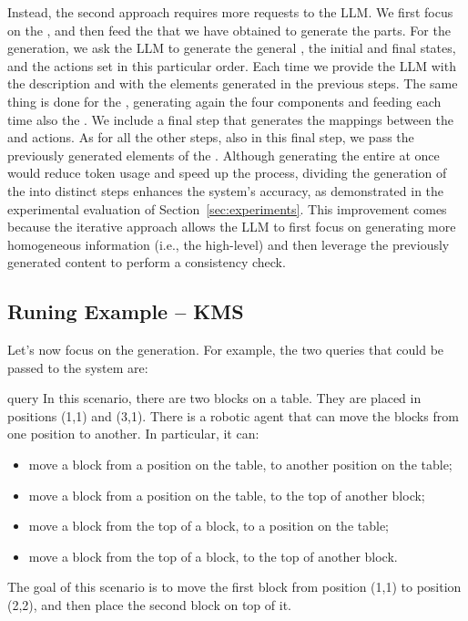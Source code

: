 Instead, the second approach requires more requests to the LLM. We first focus on the \HL \kb, and then feed the \kb that we have obtained to generate the \LL parts. For the \HL generation, we ask the LLM to generate the general \kb, the initial and final states, and the actions set in this particular order. Each time we provide the LLM with the \HL description and with the elements generated in the previous steps. The same thing is done for the \LL \kb, generating again the four components and feeding each time also the \HL \kb. We include a final step that generates the mappings between the \HL and \LL actions. As for all the other steps, also in this final step, we pass the previously generated elements of the \LL \kb. 
Although generating the entire \kbase at once would reduce token usage and speed up the process, dividing the generation of the \kb into distinct steps enhances the system's accuracy, as demonstrated in the experimental evaluation of Section~\ref{sec:experiments}. This improvement comes because the iterative approach allows the LLM to first focus on generating more homogeneous information (i.e., the high-level) and then leverage the previously generated content to perform a consistency check.  

\subsection{Runing Example -- KMS}
\label{sssec:runegKMS}



Let's now focus on the \kbase generation. For example, the two queries that could be passed to the system are:

\begin{textbox}{\HL query}
\footnotesize
In this scenario, there are two blocks on a table. They are placed in positions (1,1) and (3,1). There is a robotic agent that can move the blocks from one position to another. In particular, it can:
\begin{itemize}
    \item move a block from a position on the table, to another position on the table;
    \item move a block from a position on the table, to the top of another block;
    \item move a block from the top of a block, to a position on the table;
    \item move a block from the top of a block, to the top of another block.
\end{itemize}
The goal of this scenario is to move the first block from position (1,1) to position (2,2), and then place the second block on top of it.
\end{textbox}

